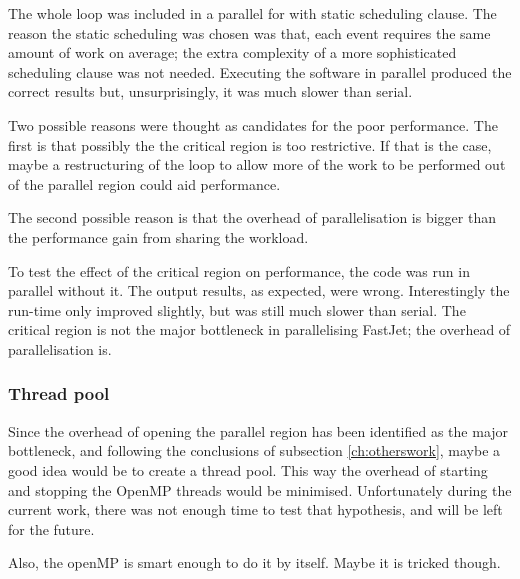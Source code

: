 The whole loop was included in a parallel for with static scheduling clause. The reason the static scheduling was chosen was that, each event requires the same amount of work on average; the extra complexity of a more sophisticated scheduling clause was not needed. Executing the software in parallel produced the correct results but, unsurprisingly, it was much slower than serial. 

Two possible reasons were thought as candidates for the poor performance. The first is that possibly the the critical region is too restrictive. If that is the case, maybe a restructuring of the loop to allow more of the work to be performed out of the parallel region could aid performance. 

The second possible reason is that the overhead of parallelisation is bigger than the performance gain from sharing the workload.

To test the effect of the critical region on performance, the code was run in parallel without it. The output results, as expected, were wrong. Interestingly the run-time only improved slightly, but was still much slower than serial. The critical region is not the major bottleneck in parallelising FastJet; the overhead of parallelisation is.

\subsubsection{Thread pool}
Since the overhead of opening the parallel region has been identified as the major bottleneck, and following the conclusions of subsection \ref{ch:otherswork}, maybe a good idea would be to create a thread pool. This way the overhead of starting and stopping the OpenMP threads would be minimised. Unfortunately during the current work, there was not enough time to test that hypothesis, and will be left for the future.

Also, the openMP is smart enough to do it by itself. Maybe it is tricked though.

